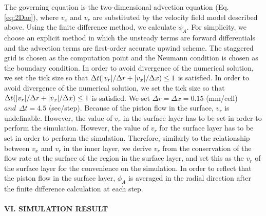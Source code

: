\documentclass[prl,twocolumn,superscriptaddress]{revtex4}
\begin{document}
The governing equation is the two-dimensional advection equation (Eq. \ref{eq:2Dae}), where $v_x$ and $v_r$ are substituted by the velocity field model described above. Using the finite difference method, we calculate $\phi_A$. For simplicity, we choose an explicit method in which the unsteady terms are forward differentials and the advection terms are first-order accurate upwind scheme. The staggered grid is chosen as the computation point and the Neumann condition is chosen as the boundary condition. In order to avoid divergence of the numerical solution, we set the tick size so that $\Delta t\qty(|v_r|/\Delta r+|v_x|/\Delta x)\leq1$ is satisfied. In order to avoid divergence of the numerical solution, we set the tick size so that $\Delta t\qty(|v_r|/\Delta r+|v_x|/\Delta x)\leq1$ is satisfied.  We set $\Delta r = \Delta x = 0.15$ (mm/cell)$ and \hspace{5pt}\Delta t = 4.5$ (sec/step). Because of the piston flow in the surface, $v_r$ is undefinable. However, the value of $v_r$ in the surface layer has to be set in order to perform the simulation. However, the value of $v_r$ for the surface layer has to be set in order to perform the simulation. Therefore, similarly to the relationship between $v_x$ and $v_r$ in the inner layer, we derive $v_r$ from the conservation of the flow rate at the surface of the region in the surface layer, and set this as the $v_r$ of the surface layer for the convenience on the simulation.  In order to reflect that the piston flow in the surface layer, $\phi_A$ is averaged in the radial direction after the finite difference calculation at each step. \\
\\
{\bf V\hspace{-.1em}I. SIMULATION RESULT} \\
\end{document}
